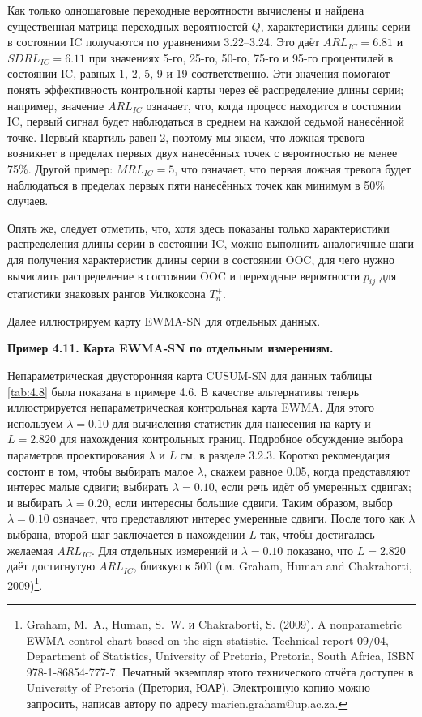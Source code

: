 Как только одношаговые переходные вероятности вычислены и найдена существенная матрица переходных вероятностей \(Q\), характеристики длины серии в состоянии IC получаются по уравнениям 3.22--3.24. Это даёт \(ARL_{IC} = 6.81\) и \(SDRL_{IC} = 6.11\) при значениях 5-го, 25-го, 50-го, 75-го и 95-го процентилей в состоянии IC, равных 1, 2, 5, 9 и 19 соответственно. Эти значения помогают понять эффективность контрольной карты через её распределение длины серии; например, значение \(ARL_{IC}\) означает, что, когда процесс находится в состоянии IC, первый сигнал будет наблюдаться в среднем на каждой седьмой нанесённой точке. Первый квартиль равен 2, поэтому мы знаем, что ложная тревога возникнет в пределах первых двух нанесённых точек с вероятностью не менее 75\%. Другой пример: \(MRL_{IC} = 5\), что означает, что первая ложная тревога будет наблюдаться в пределах первых пяти нанесённых точек как минимум в 50\% случаев.

Опять же, следует отметить, что, хотя здесь показаны только характеристики распределения длины серии в состоянии IC, можно выполнить аналогичные шаги для получения характеристик длины серии в состоянии OOC, для чего нужно вычислить распределение в состоянии OOC и переходные вероятности \(p_{ij}\) для статистики знаковых рангов Уилкоксона \(T_n^+\).

Далее иллюстрируем карту EWMA-SN для отдельных данных.

\noindent\textbf{Пример 4.11. Карта EWMA-SN по отдельным измерениям.}

Непараметрическая двусторонняя карта CUSUM-SN для данных таблицы \ref{tab:4.8} была показана в примере 4.6. В качестве альтернативы теперь иллюстрируется непараметрическая контрольная карта EWMA. Для этого используем \(\lambda = 0.10\) для вычисления статистик для нанесения на карту и \(L = 2.820\) для нахождения контрольных границ. Подробное обсуждение выбора параметров проектирования \(\lambda\) и \(L\) см. в разделе 3.2.3. Коротко рекомендация состоит в том, чтобы выбирать малое \(\lambda\), скажем равное 0.05, когда представляют интерес малые сдвиги; выбирать \(\lambda = 0.10\), если речь идёт об умеренных сдвигах; и выбирать \(\lambda = 0.20\), если интересны большие сдвиги. Таким образом, выбор \(\lambda = 0.10\) означает, что представляют интерес умеренные сдвиги. После того как \(\lambda\) выбрана, второй шаг заключается в нахождении \(L\) так, чтобы достигалась желаемая \(ARL_{IC}\). Для отдельных измерений и \(\lambda = 0.10\) показано, что \(L = 2.820\) даёт достигнутую \(ARL_{IC}\), близкую к 500 (см. Graham, Human and Chakraborti, 2009)\footnote{Graham, M.~A., Human, S.~W. и Chakraborti, S. (2009). A nonparametric EWMA control chart based on the sign statistic. Technical report 09/04, Department of Statistics, University of Pretoria, Pretoria, South Africa, ISBN 978-1-86854-777-7. Печатный экземпляр этого технического отчёта доступен в University of Pretoria (Претория, ЮАР). Электронную копию можно запросить, написав автору по адресу marien.graham@up.ac.za.}.

